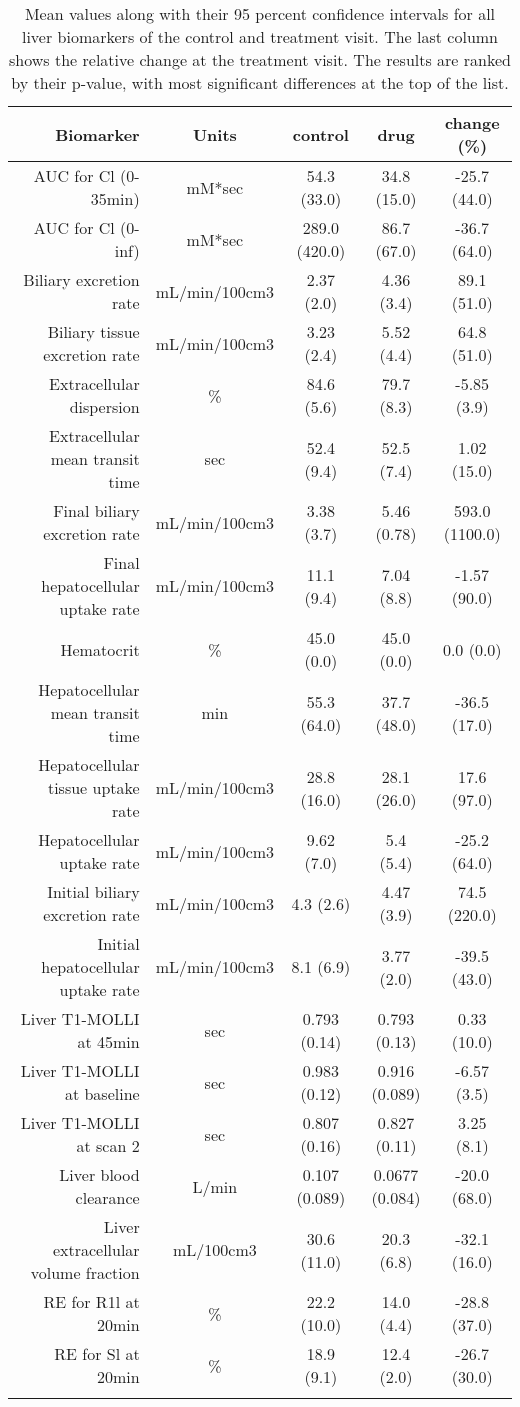 \documentclass{epflreport}%
\begin{document}
\begin{longtable}{rcccc}%
\hline%
Biomarker&Units&control&drug&change (\%)\\%
\hline%
AUC for Cl (0{-}35min)&mM*sec&54.3 (33.0) &34.8 (15.0) &{-}25.7 (44.0) \\%
AUC for Cl (0{-}inf)&mM*sec&289.0 (420.0) &86.7 (67.0) &{-}36.7 (64.0) \\%
Biliary excretion rate&mL/min/100cm3&2.37 (2.0) &4.36 (3.4) &89.1 (51.0) \\%
Biliary tissue excretion rate&mL/min/100cm3&3.23 (2.4) &5.52 (4.4) &64.8 (51.0) \\%
Extracellular dispersion&\%&84.6 (5.6) &79.7 (8.3) &{-}5.85 (3.9) \\%
Extracellular mean transit time&sec&52.4 (9.4) &52.5 (7.4) &1.02 (15.0) \\%
Final biliary excretion rate&mL/min/100cm3&3.38 (3.7) &5.46 (0.78) &593.0 (1100.0) \\%
Final hepatocellular uptake rate&mL/min/100cm3&11.1 (9.4) &7.04 (8.8) &{-}1.57 (90.0) \\%
Hematocrit&\%&45.0 (0.0) &45.0 (0.0) &0.0 (0.0) \\%
Hepatocellular mean transit time&min&55.3 (64.0) &37.7 (48.0) &{-}36.5 (17.0) \\%
Hepatocellular tissue uptake rate&mL/min/100cm3&28.8 (16.0) &28.1 (26.0) &17.6 (97.0) \\%
Hepatocellular uptake rate&mL/min/100cm3&9.62 (7.0) &5.4 (5.4) &{-}25.2 (64.0) \\%
Initial biliary excretion rate&mL/min/100cm3&4.3 (2.6) &4.47 (3.9) &74.5 (220.0) \\%
Initial hepatocellular uptake rate&mL/min/100cm3&8.1 (6.9) &3.77 (2.0) &{-}39.5 (43.0) \\%
Liver T1{-}MOLLI at 45min&sec&0.793 (0.14) &0.793 (0.13) &0.33 (10.0) \\%
Liver T1{-}MOLLI at baseline&sec&0.983 (0.12) &0.916 (0.089) &{-}6.57 (3.5) \\%
Liver T1{-}MOLLI at scan 2&sec&0.807 (0.16) &0.827 (0.11) &3.25 (8.1) \\%
Liver blood clearance&L/min&0.107 (0.089) &0.0677 (0.084) &{-}20.0 (68.0) \\%
Liver extracellular volume fraction&mL/100cm3&30.6 (11.0) &20.3 (6.8) &{-}32.1 (16.0) \\%
RE for R1l at 20min&\%&22.2 (10.0) &14.0 (4.4) &{-}28.8 (37.0) \\%
RE for Sl at 20min&\%&18.9 (9.1) &12.4 (2.0) &{-}26.7 (30.0) \\%
\hline%
\caption{Mean values along with their 95 percent confidence intervals for all liver biomarkers of the control and treatment visit. The last column shows the relative change at the treatment visit. The results are ranked by their p-value, with most significant differences at the top of the list.} \\%
\end{longtable}%
\clearpage%
\end{document}
